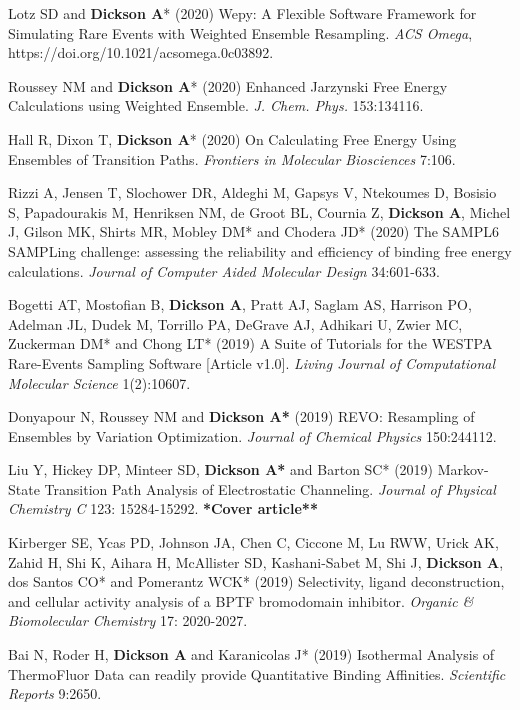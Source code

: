 \documentclass[margin,line]{res}
\begin{document}
\begin{resume}
\begin{spacing}{1.2}
\begin{thebibliography}{10}
Lotz SD and {\bf Dickson A}* (2020) Wepy: A Flexible Software Framework for Simulating Rare Events with Weighted Ensemble Resampling.
\newblock \textit{ACS Omega}, https://doi.org/10.1021/acsomega.0c03892.

Roussey NM and {\bf Dickson A}* (2020) Enhanced Jarzynski Free Energy Calculations using Weighted Ensemble.
\newblock \textit{J. Chem. Phys.} 153:134116.

Hall R, Dixon T, {\bf Dickson A}* (2020) On Calculating Free Energy Using Ensembles of Transition Paths. 
\newblock \textit{Frontiers in Molecular Biosciences} 7:106.

Rizzi A, Jensen T, Slochower DR, Aldeghi M, Gapsys V, Ntekoumes D, Bosisio S, Papadourakis M, Henriksen NM, de Groot BL, Cournia Z, {\bf Dickson A}, Michel J, Gilson MK, Shirts MR, Mobley DM* and Chodera JD* (2020) The SAMPL6 SAMPLing challenge: assessing the reliability and efficiency of binding free energy calculations. 
\newblock \textit{Journal of Computer Aided Molecular Design} 34:601-633.

  Bogetti AT, Mostofian B, {\bf Dickson A}, Pratt AJ, Saglam AS, Harrison PO, Adelman JL, Dudek M, Torrillo PA, DeGrave AJ, Adhikari U, Zwier MC, Zuckerman DM* and Chong LT* (2019) A Suite of Tutorials for the WESTPA Rare-Events Sampling Software [Article v1.0].
\newblock \textit{Living Journal of Computational Molecular Science} 1(2):10607.

  Donyapour N, Roussey NM and {\bf Dickson A*} (2019) REVO: Resampling of Ensembles by Variation Optimization.
  \newblock \textit{Journal of Chemical Physics} 150:244112.

  Liu Y, Hickey DP, Minteer SD, {\bf Dickson A*} and Barton SC* (2019) Markov-State Transition Path Analysis of Electrostatic Channeling.
  \newblock \textit{Journal of Physical Chemistry C} 123: 15284-15292. {\bf **Cover article**}

  Kirberger SE, Ycas PD, Johnson JA, Chen C, Ciccone M, Lu RWW, Urick AK, Zahid H, Shi K, Aihara H, McAllister SD, Kashani-Sabet M, Shi J, {\bf Dickson A}, dos Santos CO* and Pomerantz WCK* (2019) Selectivity, ligand deconstruction, and cellular activity analysis of a BPTF bromodomain inhibitor.
  \newblock \textit{Organic \& Biomolecular Chemistry} 17: 2020-2027.

  Bai N, Roder H, {\bf Dickson A} and Karanicolas J* (2019) Isothermal Analysis of ThermoFluor Data can readily provide Quantitative Binding Affinities.
  \newblock \textit{Scientific Reports} 9:2650.


\end{thebibliography}
\end{spacing}
\end{resume}
\end{document}
